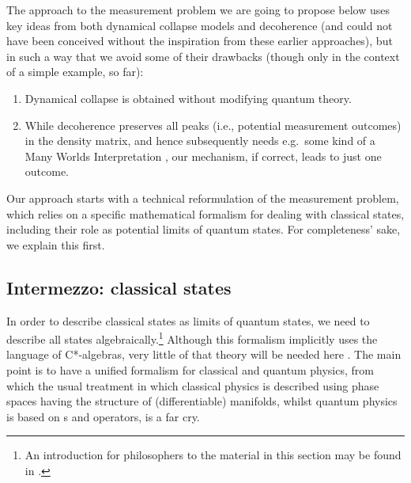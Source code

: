 \documentclass[12pt]{article}
\begin{document}
The approach to the measurement problem we are going to propose below uses key ideas from both dynamical collapse models and decoherence (and could not have been conceived without the inspiration from these earlier approaches), but in such a way
that we avoid some of their drawbacks (though only in the context of a simple example, so far):
\begin{enumerate}
\item Dynamical collapse is obtained without modifying quantum theory.
\item While decoherence preserves all peaks (i.e., potential measurement outcomes) in the density matrix, and hence subsequently needs e.g.\ some kind of a Many Worlds Interpretation \cite{Han, Schloss,Wallace}, our mechanism, if correct, leads to just one outcome.
\end{enumerate}
Our approach starts with a technical reformulation of the  measurement problem, which relies on a specific mathematical formalism for dealing with classical states, including their role as potential limits of quantum states. For completeness' sake, we explain this first. 
\subsection{Intermezzo: classical states}\label{classicalstates}
In order to describe classical states as limits of quantum states,  we need to  describe all states algebraically.\footnote{An introduction for philosophers  to the material in this section may be found in \cite[Ch.\ 4\&5]{handbook}.} Although this formalism implicitly uses the language of C*-algebras, very little of that theory will be needed here \cite{Haag,book}. The main point is to have a unified formalism for classical and quantum physics, from which the usual treatment in which classical physics is described using phase spaces having the structure of (differentiable) manifolds, whilst quantum physics is based on \Hs s and operators, is a far cry. 
\end{document}

